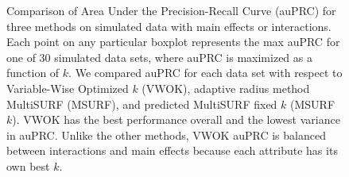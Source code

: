 \documentclass[10pt,letterpaper]{article}
\begin{document}
\begin{figure}[!bht]
	\caption{Comparison of Area Under the Precision-Recall Curve (auPRC) for three methods on simulated data with main effects or interactions. Each point on any particular boxplot represents the max auPRC for one of 30 simulated data sets, where auPRC is maximized as a function of $k$. We compared auPRC for each data set with respect to Variable-Wise Optimized $k$ (VWOK), adaptive radius method MultiSURF (MSURF), and predicted MultiSURF fixed $k$ (MSURF $k$). VWOK has the best performance overall and the lowest variance in auPRC. Unlike the other methods, VWOK auPRC is balanced between interactions and main effects because each attribute has its own best $k$.}\label{fig:auPRC-compare-vwok-msurf-predk}
\end{figure}
\end{document}
